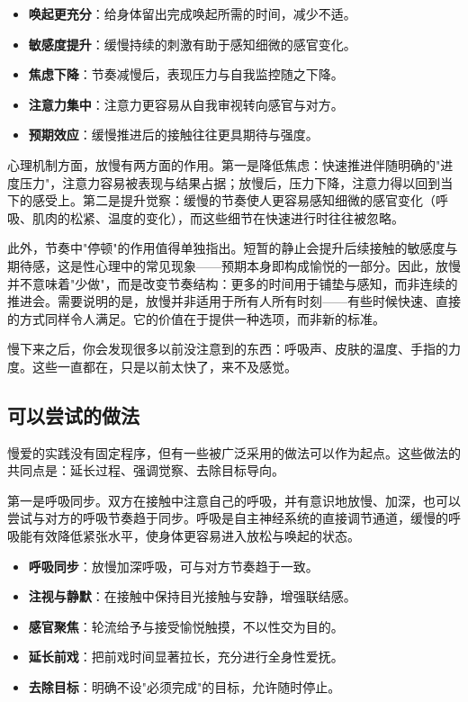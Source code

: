 \documentclass[12pt,UTF8]{ctexbook}
\newcommand{\keyword}[1]{\textbf{#1}}
\begin{document}
\begin{itemize}
	\item \keyword{唤起更充分}：给身体留出完成唤起所需的时间，减少不适。
	\item \keyword{敏感度提升}：缓慢持续的刺激有助于感知细微的感官变化。
	\item \keyword{焦虑下降}：节奏减慢后，表现压力与自我监控随之下降。
	\item \keyword{注意力集中}：注意力更容易从自我审视转向感官与对方。
	\item \keyword{预期效应}：缓慢推进后的接触往往更具期待与强度。
\end{itemize}

心理机制方面，放慢有两方面的作用。第一是降低焦虑：快速推进伴随明确的"进度压力"，注意力容易被表现与结果占据；放慢后，压力下降，注意力得以回到当下的感受上。第二是提升觉察：缓慢的节奏使人更容易感知细微的感官变化（呼吸、肌肉的松紧、温度的变化），而这些细节在快速进行时往往被忽略。

此外，节奏中"停顿"的作用值得单独指出。短暂的静止会提升后续接触的敏感度与期待感，这是性心理中的常见现象——预期本身即构成愉悦的一部分。因此，放慢并不意味着"少做"，而是改变节奏结构：更多的时间用于铺垫与感知，而非连续的推进会。需要说明的是，放慢并非适用于所有人所有时刻——有些时候快速、直接的方式同样令人满足。它的价值在于提供一种选项，而非新的标准。

\begin{tcolorbox}[colback=pink!5!white,colframe=red!50!black,title=贴心小叮咛]
	慢下来之后，你会发现很多以前没注意到的东西：呼吸声、皮肤的温度、手指的力度。这些一直都在，只是以前太快了，来不及感觉。
\end{tcolorbox}
\subsection{可以尝试的做法}

慢爱的实践没有固定程序，但有一些被广泛采用的做法可以作为起点。这些做法的共同点是：延长过程、强调觉察、去除目标导向。

第一是呼吸同步。双方在接触中注意自己的呼吸，并有意识地放慢、加深，也可以尝试与对方的呼吸节奏趋于同步。呼吸是自主神经系统的直接调节通道，缓慢的呼吸能有效降低紧张水平，使身体更容易进入放松与唤起的状态。

\begin{itemize}
	\item \keyword{呼吸同步}：放慢加深呼吸，可与对方节奏趋于一致。
	\item \keyword{注视与静默}：在接触中保持目光接触与安静，增强联结感。
	\item \keyword{感官聚焦}：轮流给予与接受愉悦触摸，不以性交为目的。
	\item \keyword{延长前戏}：把前戏时间显著拉长，充分进行全身性爱抚。
	\item \keyword{去除目标}：明确不设"必须完成"的目标，允许随时停止。
\end{itemize}
\end{document}
